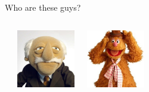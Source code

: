 \documentclass{beamer}\usepackage[]{graphicx}\usepackage[]{color}
\begin{document}
\begin{darkframes}
\begin{frame}{Who are these guys?}
\begin{columns}[onlytextwidth]
\begin{center}
      \end{center}
      \begin{center}
        \includegraphics[width=1in]{waldorf} \\
      \end{center}
      \begin{center}
        \includegraphics[width=1in]{fozziebear} \\
      \end{center}
  \end{columns}
\end{frame}


\end{darkframes}
\end{document}
